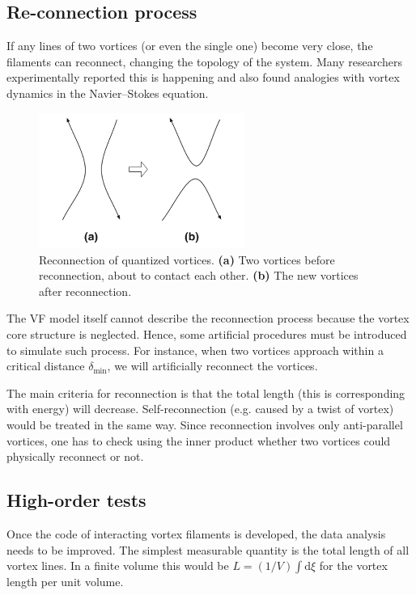 \subsection*{Re-connection process}

If any lines of two vortices (or even the single one) become very close,
the filaments can reconnect, changing the topology of the system.
Many researchers experimentally reported this is happening and also found analogies with vortex dynamics in the Navier–Stokes equation.

\begin{figure}[h]
	\centering
	\includegraphics[width=0.6\textwidth]{graphics/simul/reconnection}
	\caption{Reconnection of quantized vortices. \textbf{(a)} Two vortices before reconnection, about to contact each other. \textbf{(b)} The new vortices after reconnection.}
\end{figure}

The VF model itself cannot describe the reconnection process because the vortex core structure is neglected. Hence, some artificial procedures must be introduced to simulate such process. For instance, when two vortices approach within a critical distance $\delta_{\text{min}}$, we will artificially reconnect the vortices.

The main criteria for reconnection is that the total length (this is corresponding with energy) will decrease. Self-reconnection (e.g. caused by a twist of vortex) would be treated in the same way. Since reconnection involves only anti-parallel vortices, one has to check using the inner product whether two vortices could physically reconnect or not.

\subsection*{High-order tests}

Once the code of interacting vortex filaments is developed, the data analysis needs to be improved. The simplest measurable quantity is the total length of all vortex lines. In a finite volume this would be $L = (1/V) \int \text{d}\xi$ for the vortex length per unit volume.

